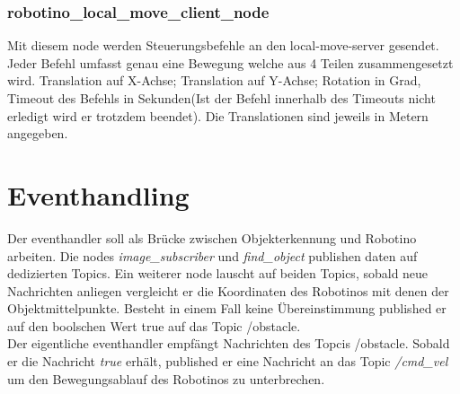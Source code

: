 		\subsubsection{robotino\_local\_move\_client\_node}
		Mit diesem node werden Steuerungsbefehle an den local-move-server gesendet. Jeder Befehl umfasst genau eine Bewegung welche aus 4 Teilen zusammengesetzt wird. Translation auf X-Achse; Translation auf Y-Achse; Rotation in Grad, Timeout des Befehls in Sekunden(Ist der Befehl innerhalb des Timeouts nicht erledigt wird er trotzdem beendet). Die Translationen sind jeweils in Metern angegeben.

	\section{Eventhandling}
	Der eventhandler soll als Brücke zwischen Objekterkennung und Robotino arbeiten. Die nodes \textit{image\_subscriber} und \textit{find\_object} publishen daten auf dedizierten Topics. Ein weiterer node lauscht auf beiden Topics, sobald neue Nachrichten anliegen vergleicht er die Koordinaten des Robotinos mit denen der Objektmittelpunkte. Besteht in einem Fall keine Übereinstimmung published er auf den boolschen Wert true auf das Topic /obstacle.\\
	Der eigentliche eventhandler empfängt Nachrichten des Topcis /obstacle. Sobald er die Nachricht \textit{true} erhält, published er eine Nachricht an das Topic \textit{/cmd\_vel} um den Bewegungsablauf des Robotinos zu unterbrechen.
	
	

